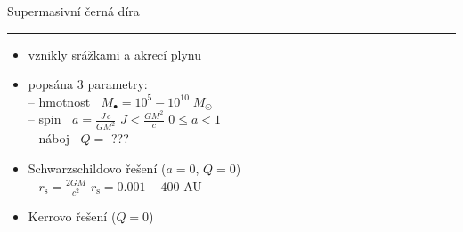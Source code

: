 \documentclass[aspectratio=43]{beamer}
\begin{document}
\begin{frame}{\vspace{-2mm}Supermasivní černá díra\phantom{j$^1$}\\\vspace{1.5mm}\hrule}
\vspace{4mm}
\begin{itemize}
    \item<2-> vznikly srážkami a akrecí plynu\\ \vspace{4.0mm}
    \item<4-> popsána 3 parametry:\\ \vspace{3.0mm}
        --  hmotnost $\;\; M_{\bullet} = 10^5 - 10^{10} \; M_{\odot}$\\ \vspace{3.0mm}
        --  spin $\;\; a = \frac{J \, c}{G M^2}$ \hspace{4mm} $J < \frac{G M^2}{c}$ \hspace{4mm} $0 \leq a < 1$\\ \vspace{3.0mm}
        --  náboj $\;\; Q = $ ???\\ \vspace{4.0mm}
    \item<6-> Schwarzschildovo řešení ($a = 0$, $Q = 0$)\\ \vspace{3.5mm}
        \phantom{a} $\;\;\; r_{\text{s}} = \frac{2GM}{c^2}$ \hspace{7mm} $r_{\text{s}} = 0.001 - 400$ AU\\ \vspace{4.0mm}
    \item<7-> Kerrovo řešení ($Q = 0$)\\
\end{itemize}
\end{frame}
\end{document}
